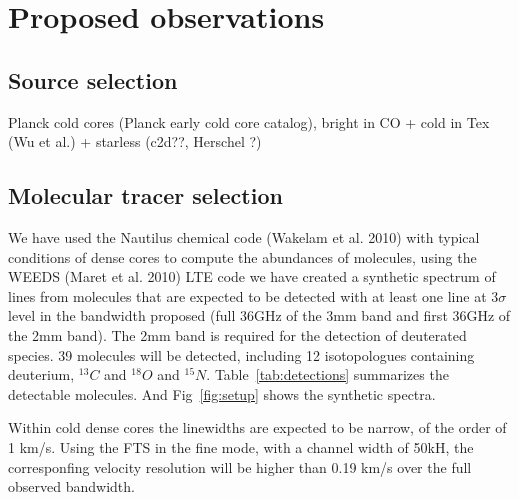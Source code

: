 \section{Proposed observations}
\subsection{Source selection}
  Planck cold cores (Planck early cold core catalog), bright in CO + cold in Tex (Wu et al.) + starless (c2d??, Herschel ?)
\subsection{Molecular tracer selection}
  We have used the Nautilus chemical code (Wakelam et al. 2010) with typical conditions of dense cores to compute the abundances of molecules, using the WEEDS (Maret et al. 2010) LTE code we have created a synthetic spectrum of lines from molecules that are expected to be detected with at least one line at 3$\sigma$ level in the bandwidth proposed (full 36GHz of the 3mm band and first 36GHz of the 2mm band). The 2mm band is required for the detection of deuterated species. 39 molecules will be detected, including 12 isotopologues containing deuterium, $^{13}C$ and $^{18}O$ and $^{15}N$. Table~\ref{tab:detections} summarizes the detectable molecules. And Fig~\ref{fig:setup} shows the synthetic spectra.
  
  Within cold dense cores the linewidths are expected to be narrow, of the order of 1 km/s. Using the FTS in the fine mode, with a channel width of 50kH, the corresponfing velocity resolution will be higher than 0.19 km/s over the full observed bandwidth. 
  
  
  
  
  
  
  
  
  